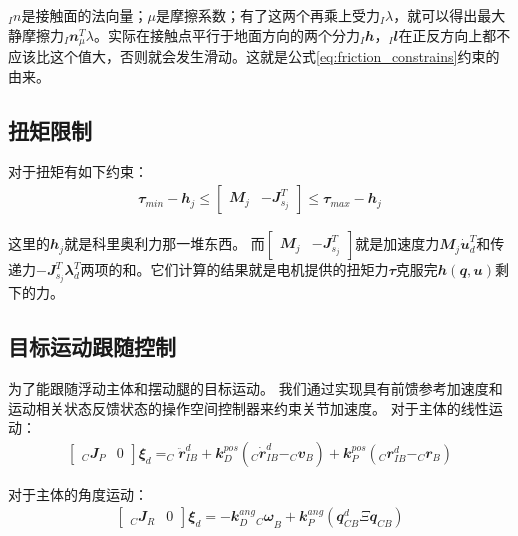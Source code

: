 $_In$是接触面的法向量；$\mu$是摩擦系数；有了这两个再乘上受力$_I\lambda$，就可以得出最大静摩擦力$_I{\mathbfit n}_{\mu}^T \lambda$。实际在接触点平行于地面方向的两个分力$_I{\mathbfit h}$，$_I{\mathbfit l}$在正反方向上都不应该比这个值大，否则就会发生滑动。这就是公式\eqref{eq:friction_constrains}约束的由来。

\subsection[扭矩限制]{扭矩限制}
对于扭矩有如下约束：
\begin{align}
    \label{eq:torque_constrains}
    {\mathbfit \tau}_{min}-{\mathbfit h}_j 
    \leq \begin{bmatrix} {\mathbfit M}_j & -{\mathbfit J}^T_{s_j} \end{bmatrix} 
    \leq {\mathbfit \tau}_{max}-{\mathbfit h}_j 
\end{align}

这里的${\mathbfit h}_j$就是科里奥利力那一堆东西。
而$\begin{bmatrix} {\mathbfit M}_j & -{\mathbfit J}^T_{s_j} \end{bmatrix}$就是加速度力${\mathbfit M}_j  \dot{\mathbfit u}_d^T$和传递力$-{\mathbfit J}^T_{s_j} {\mathbfit \lambda}_d^T$两项的和。它们计算的结果就是电机提供的扭矩力${\mathbfit \tau}$克服完${\mathbfit h}({\mathbfit q}, {\mathbfit u})$剩下的力。

\subsection[目标运动跟随控制]{目标运动跟随控制}

为了能跟随浮动主体和摆动腿的目标运动。
我们通过实现具有前馈参考加速度和运动相关状态反馈状态的操作空间控制器来约束关节加速度。
对于主体的线性运动：
\begin{align}
    \begin{bmatrix}
    _C{\mathbfit J}_P & {\mathbfit 0}
    \end{bmatrix} 
    {\mathbfit \xi}_d = _C\ddot {\mathbfit r}_{IB}^d 
    + {\mathbfit k}_D^{pos}(_C \dot{\mathbfit r}_{IB}^d-_C{\mathbfit v}_B) 
    + {\mathbfit k}_P^{pos}(_C{\mathbfit r}_{IB}^d-_C{\mathbfit r}_B)
\end{align}

对于主体的角度运动：
\begin{align}
    \begin{bmatrix}
    _C{\mathbfit J}_R & {\mathbfit 0}
    \end{bmatrix} 
    {\mathbfit \xi}_d = 
    - {\mathbfit k}_D^{ang} {_C{\mathbfit \omega}}_{B}
    + {\mathbfit k}_P^{ang}({\mathbfit q}_{CB}^d \Xi {\mathbfit q}_{CB})
\end{align}


